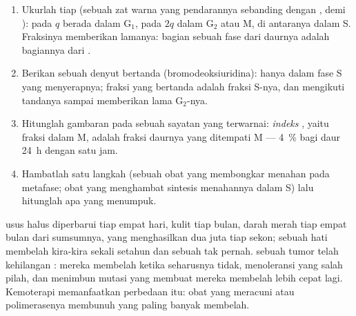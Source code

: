 \begin{method}\label{met:b1:replication-mitosis:reading}
\begin{enumerate}
  \item Ukurlah  tiap  (sebuah zat warna yang pendarannya
        sebanding dengan ,  demi ):  pada $q$ berada
        dalam G$_1$, pada $2q$ dalam G$_2$ atau M, di antaranya dalam S.
        Fraksinya memberikan lamanya: bagian sebuah fase dari daurnya
        adalah bagiannya dari .
  \item Berikan sebuah denyut  bertanda
        (bromodeoksiuridina): hanya  dalam fase S yang menyerapnya;
        fraksi yang bertanda adalah fraksi S-nya, dan mengikuti tandanya
        sampai  memberikan lama G$_2$-nya.
  \item Hitunglah gambaran  pada sebuah sayatan yang terwarnai:
        \emph{indeks }, yaitu fraksi  dalam M, adalah fraksi
        daurnya yang ditempati M --- \qty{4}{\%} bagi daur \qty{24}{h}
        dengan  satu jam.
  \item Hambatlah satu langkah (sebuah obat yang membongkar 
        menahan  pada metafase; obat yang menghambat sintesis 
        menahannya dalam S) lalu hitunglah apa yang menumpuk.
\end{enumerate}
\end{method}

\begin{example}[Perputaran]\label{ex:b1:replication-mitosis:turnover}
 usus halus diperbarui tiap empat hari, kulit tiap bulan, 
darah merah tiap empat bulan dari sumsumnya, yang menghasilkan dua juta
tiap sekon; sebuah  hati membelah kira-kira sekali setahun dan
sebuah  tak pernah.  sebuah tumor telah kehilangan : mereka membelah ketika seharusnya tidak, menoleransi
 yang salah pilah, dan menimbun mutasi yang membuat mereka
membelah lebih cepat lagi. Kemoterapi memanfaatkan perbedaan itu: obat
yang meracuni  atau polimerasenya membunuh  yang paling
banyak membelah.
\end{example}

